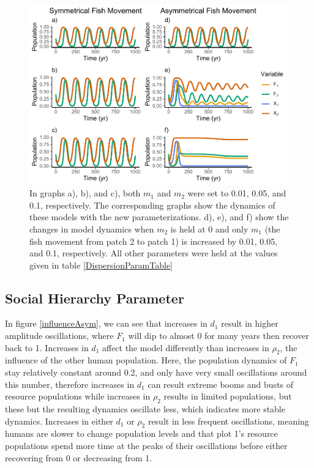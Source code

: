 \documentclass[
  12pt,
]{article}
\begin{document}
\begin{figure}
\centering
\includegraphics{Wulfing_CH2_Draft4_files/figure-latex/Movement-1.pdf}
\caption{\label{fig:Movement}In graphs a), b), and c), both \(m_1\) and \(m_2\) were set to 0.01, 0.05, and 0.1, respectively. The corresponding graphs show the dynamics of these models with the new parameterizations. d), e), and f) show the changes in model dynamics when \(m_2\) is held at 0 and only \(m_1\) (the fish movement from patch 2 to patch 1) is increased by 0.01, 0.05, and 0.1, respectively. All other parameters were held at the values given in table \ref{DispersionParamTable} \label{Movement}}
\end{figure}

\subsection{Social Hierarchy Parameter}\label{social-hierarchy-parameter}

In figure \ref{influenceAsym}, we can see that increases in \(d_1\) result in higher amplitude oscillations, where \(F_1\) will dip to almost 0 for many years then recover back to 1. Increases in \(d_1\) affect the model differently than increases in \(\rho_2\), the influence of the other human population. Here, the population dynamics of \(F_1\) stay relatively constant around 0.2, and only have very small oscillations around this number, therefore increases in \(d_1\) can result extreme booms and busts of resource populations while increases in \(\rho_2\) results in limited populations, but these but the resulting dynamics oscillate less, which indicates more stable dynamics. Increases in either \(d_1\) or \(\rho_2\) result in less frequent oscillations, meaning humans are slower to change population levels and that plot 1's resource populations spend more time at the peaks of their oscillations before either recovering from 0 or decreasing from 1.
\end{document}
